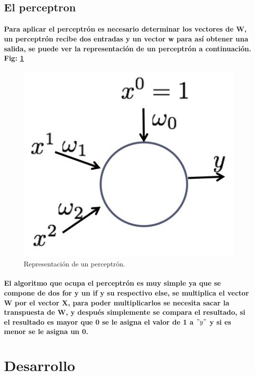 \documentclass[10pt,a4paper]{article}
\begin{document}
\subsection{El perceptron}

\paragraph{Para aplicar el perceptr\'on es necesario determinar los vectores de W, un perceptr\'on recibe dos entradas y un vector w para as\'i obtener una salida, se puede ver la representaci\'on de un perceptr\'on a continuaci\'on. Fig: \ref{fig:Rperceptron} }
\begin{figure}[h]
\includegraphics[scale=0.4] {RepPerc.jpg}
\caption{Representaci\'on de un perceptr\'on.}
\label{fig:Rperceptron}
\end{figure}

\paragraph{El algoritmo que ocupa el perceptr\'on es muy simple ya que se compone de dos for y un if y su respectivo else, se multiplica el vector W por el vector X, para poder multiplicarlos se necesita sacar la transpuesta de W, y despu\'es simplemente se compara el resultado, si el resultado es mayor que 0 se le asigna el valor de 1 a $"y"$ y si es menor se le asigna un 0.}

\section{Desarrollo}
\end{document}
